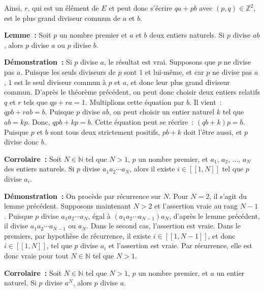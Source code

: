 Ainsi, $r$, qui est un élément de $E$ et peut donc s'écrire $q a + p b$ avec $(p, q) \in \mathbb{Z}^2$, est le plus grand diviseur commun de $a$ et $b$.

\done

\bigskip
\noindent\textbf{Lemme :} 
Soit $p$ un nombre premier et $a$ et $b$ deux entiers naturels. 
Si $p$ divise $a b$, alors $p$ divise $a$ ou $p$ divise $b$.

\medskip

\noindent\textbf{Démonstration :} 
Si $p$ divise $a$, le résultat est vrai. 
Supposons que $p$ ne divise pas $a$. 
Puisque les seuls diviseurs de $p$ sont $1$ et lui-même, et car $p$ ne divise pas $a$, $1$ est le seul diviseur commun à $p$ et $a$, et donc leur plus grand diviseur commun. 
D'après le théorème précédent, on peut donc choisir deux entiers relatifs $q$ et $r$ tels que $q p + r a = 1$. 
Multiplions cette équation par $b$. 
Il vient : $q p b + r a b = b$. 
Puisque $p$ divise $a b$, on peut choisir un entier naturel $k$ tel que $a b = k p$. 
Donc, $q p b + k p = b$. 
Cette équation peut se récrire : $(q b + k) p = b$. 
Puisque $p$ et $b$ sont tous deux strictement positifs, $p b + k$ doit l'être aussi, et $p$ divise donc $b$.

\done

\bigskip
\noindent\textbf{Corrolaire :} 
Soit $N \in \mathbb{N}$ tel que $N > 1$, $p$ un nombre premier, et $a_1$, $a_2$, ..., $a_N$ des entiers naturels. 
Si $p$ divise $a_1 a_2 \cdots a_N$, alors il existe $i \in [\![1,N]\!]$ tel que $p$ divise $a_i$.

\medskip

\noindent\textbf{Démonstration :} 
On procède par récurrence sur $N$. 
Pour $N = 2$, il s'agit du lemme précédent. 
Supposons maintenant $N > 2$ et l'assertion vraie au rang $N-1$. 
Puisque $p$ divise $a_1 a_2 \cdots a_N$, égal à $(a_1 a_2 \cdots a_{N-1}) a_N$, d'après le lemme précédent, il divise $a_1 a_2 \cdots a_{N-1}$ ou $a_N$. 
Dans le second cas, l'assertion est vraie. 
Dans le premiers, par hypothèse de récurrence, il existe $i \in [\![1,N-1]\!]$, et donc $i \in [\![1,N]\!]$, tel que $p$ divise $a_i$ et l'assertion est vraie. 
Par récurrence, elle est donc vraie pour tout $N \in \mathbb{N}$ tel que $N > 1$. 

\done

\medskip

\noindent\textbf{Corrolaire :} 
Soit $N \in \mathbb{N}$ tel que $N > 1$, $p$ un nombre premier, et $a$ un entier naturel.
Si $p$ divise $a^N$, alors $p$ divise $a$.


